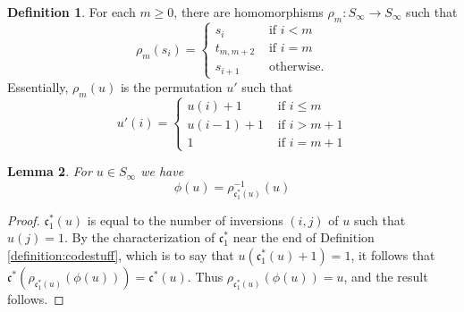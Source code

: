 \documentclass{amsart}
\newtheorem{lemma}{Lemma}[subsection]
\theoremstyle{definition}
\newtheorem{definition}[lemma]{Definition}
\theoremstyle{remark}
\numberwithin{equation}{subsection}
\newcommand{\code}{\mathfrak{c}}
\begin{document}

\begin{definition} \label{definition:rhom}
For each $m\geq 0$, there are homomorphisms $\rho_m:S_\infty\to S_\infty$ such that
$$\rho_m(s_i)=\begin{cases}
	s_i&\mbox{ if }i<m\\
	t_{m,m+2}&\mbox{ if }i=m\\
	s_{i+1}&\mbox{ otherwise.}
\end{cases}$$
Essentially, $\rho_m(u)$ is the permutation $u'$ such that
$$u'(i)=\begin{cases}
	u(i)+1&\mbox{ if }i\leq m\\
	u(i-1)+1&\mbox{ if }i>m+1\\
	1&\mbox{ if }i=m+1
\end{cases}$$
\end{definition}

\begin{lemma} \label{lemma:phitrans}
	For $u\in S_\infty$ we have
	$$\phi(u) = \rho_{\code^*_1(u)}^{-1}(u)$$
\end{lemma}
\begin{proof}
$\code^*_1(u)$ is equal to the number of inversions $(i,j)$ of $u$ such that $u(j)=1$. By the characterization of $\code^*_1$ near the end of Definition \ref{definition:codestuff}, which is to say that $u(\code^*_1(u)+1)=1$, it follows that $\code^*(\rho_{\code^*_1(u)}(\phi(u))) = \code^*(u)$. Thus $\rho_{\code^*_1(u)}(\phi(u))=u$, and the result follows.
\end{proof}
\end{document}
